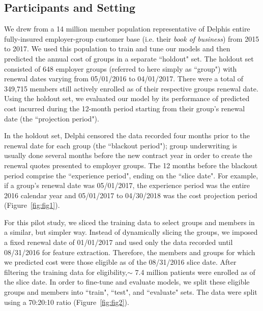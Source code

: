 \documentclass[letterpaper]{article}
\begin{document}
\subsection{Participants and Setting}
We drew from a 14 million member population representative of Delphis entire fully-insured employer-group customer base (i.e. their \textit{book of business}) from 2015 to 2017. We used this population to train and tune our models and then predicted the annual cost of groups in a separate ``holdout" set. The holdout set consisted of 648 employer groups (referred  to here simply as ``group") with renewal dates varying from 05/01/2016 to 04/01/2017. There were a total of 349,715 members still actively enrolled as of their respective groups renewal date. Using the holdout set, we evaluated our model by its performance of predicted cost incurred during the 12-month period starting from their group's renewal date (the ``projection period").


In the holdout set, Delphi censored the data recorded four months prior to the renewal date for each group (the ``blackout period"); group underwriting is usually done several months before the new contract year in order to create the renewal quotes presented to employer groups. The 12 months before the blackout period comprise the ``experience period", ending on the ``slice date". For example, if a group's renewal date was 05/01/2017, the experience period was the entire 2016 calendar year and 05/01/2017 to 04/30/2018 was the cost projection period (Figure~\ref{fig:fig1}).


For this pilot study, we sliced the training data to select groups and members in a similar, but simpler way. Instead of dynamically slicing the groups, we imposed a fixed renewal date of 01/01/2017 and used only the data recorded until 08/31/2016 for feature extraction.  Therefore, the members and groups for which we predicted cost were those eligible as of the 08/31/2016 slice date. After filtering the training data for eligibility,$\sim$ 7.4 million patients were enrolled as of the slice date. In order to fine-tune and evaluate models, we split these eligible groups and members into ``train", ``test", and ``evaluate" sets. The data were split using a 70:20:10 ratio (Figure~\ref{fig:fig2}).
\end{document}
